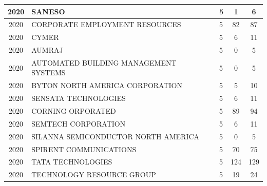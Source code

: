 \documentclass{article}%
\begin{document}
\begin{longtable}{c|p{20em}|p{5em}|c|c}
\hline%
2020&SANESO&5&1&6\\%
\hline%
2020&CORPORATE EMPLOYMENT RESOURCES&5&82&87\\%
\hline%
2020&CYMER&5&6&11\\%
\hline%
2020&AUMRAJ&5&0&5\\%
\hline%
2020&AUTOMATED BUILDING MANAGEMENT SYSTEMS&5&0&5\\%
\hline%
2020&BYTON NORTH AMERICA CORPORATION&5&5&10\\%
\hline%
2020&SENSATA TECHNOLOGIES&5&6&11\\%
\hline%
2020&CORNING ORPORATED&5&89&94\\%
\hline%
2020&SEMTECH CORPORATION&5&6&11\\%
\hline%
2020&SILANNA SEMICONDUCTOR NORTH AMERICA&5&0&5\\%
\hline%
2020&SPIRENT COMMUNICATIONS&5&70&75\\%
\hline%
2020&TATA TECHNOLOGIES&5&124&129\\%
\hline%
2020&TECHNOLOGY RESOURCE GROUP&5&19&24\\%
\hline%
\end{longtable}

%
\end{document}
